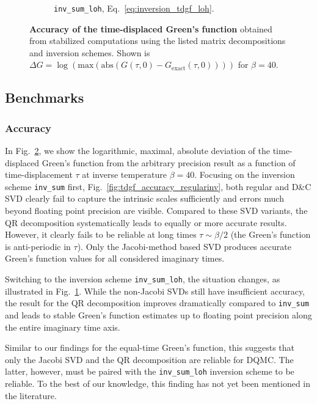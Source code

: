 \documentclass[submission, Phys]{SciPost}
\begin{document}
\begin{figure}
\begin{subfigure}{0.48\textwidth}
		\caption{\texttt{inv\_sum\_loh}, Eq.~\eqref{eq:inversion_tdgf_loh}. \label{fig:tdgf_accuracy_loh}}
	\end{subfigure}
	\vspace{5pt}
	\caption{\textbf{Accuracy of the time-displaced Green's function} obtained from stabilized computations using the listed matrix decompositions and inversion schemes. Shown is $\Delta G = \log(\textrm{max}(\textrm{abs}(G(\tau, 0) - G_{\textrm{exact}}(\tau, 0))))$ for $\beta=40$. \label{fig:tdgf_accuracy}}
\end{figure}

\subsection{Benchmarks}
\subsubsection{Accuracy}

In Fig.~\ref{fig:tdgf_accuracy}, we show the logarithmic, maximal, absolute deviation of the time-displaced Green's function from the arbitrary precision result as a function of time-displacement $\tau$ at inverse temperature $\beta=40$. Focusing on the inversion scheme \texttt{inv\_sum} first, Fig.~\ref{fig:tdgf_accuracy_regularinv}, both regular and D\&C SVD clearly fail to capture the intrinsic scales sufficiently and errors much beyond floating point precision are visible. Compared to these SVD variants, the QR decomposition systematically leads to equally or more accurate results. However, it clearly fails to be reliable at long times $\tau\sim\beta/2$ (the Green's function is anti-periodic in $\tau$). Only the Jacobi-method based SVD produces accurate Green's function values for all considered imaginary times.

Switching to the inversion scheme \texttt{inv\_sum\_loh}, the situation changes, as illustrated in Fig.~\ref{fig:tdgf_accuracy_loh}. While the non-Jacobi SVDs still have insufficient accuracy, the result for the QR decomposition improves dramatically compared to \texttt{inv\_sum} and leads to stable Green's function estimates up to floating point precision along the entire imaginary time axis.

Similar to our findings for the equal-time Green's function, this suggests that only the Jacobi SVD and the QR decomposition are reliable for DQMC. The latter, however, must be paired with the \texttt{inv\_sum\_loh} inversion scheme to be reliable. To the best of our knowledge, this finding has not yet been mentioned in the literature.
\end{document}

